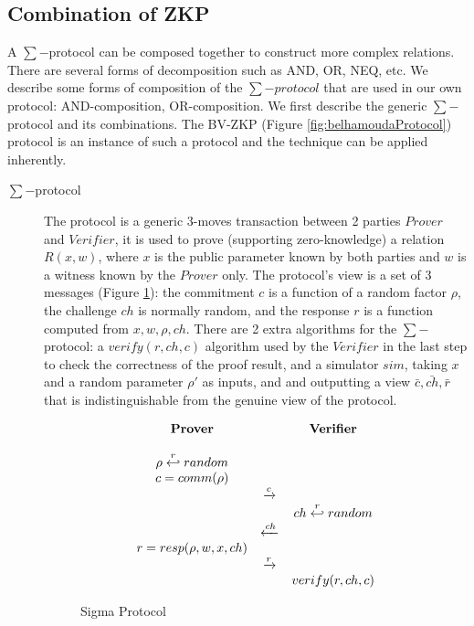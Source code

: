 \subsection{Combination of ZKP}
\label{sec:combination-zkp}
A $\sum-$protocol can be composed together to construct more complex relations.
There are several forms of decomposition such as AND, OR, NEQ, etc.  We describe
some forms of composition of the \(\sum-protocol\) that are used in our own protocol:
AND-composition, OR-composition. We first describe the generic \(\sum-\)protocol
and its combinations. The BV-ZKP (Figure \ref{fig:belhamoudaProtocol}) protocol
is an instance of such a protocol and the technique can be applied inherently.
\begin{description}
\item[$\sum-$protocol] The protocol is a generic 3-moves transaction between 2 parties
  \(Prover\) and \(Verifier\), it is used to prove (supporting zero-knowledge) a
  relation \(R(x,w)\), where \(x\) is the public parameter known by both
  parties and \(w\) is a witness known by the \(Prover\) only. The protocol's
  view is a set of 3 messages (Figure \ref{fig:sigmaProtocol}): the commitment
  \(c\) is a function of a random factor \(\rho\), the challenge \(ch\) is
  normally random, and the response \(r\) is a function computed from
  \(x, w, \rho, ch\). There are 2 extra algorithms for the \(\sum-\)protocol: a
  \(verify(r,ch,c)\) algorithm used by the \(Verifier\) in the last step to
  check the correctness of the proof result, and a simulator \(sim\), taking
  \(x\) and a random parameter \(\rho'\) as inputs, and and outputting a view
  \(\bar{c},\bar{ch},\bar{r}\) that is indistinguishable from the genuine view
  of the protocol.
  \begin{figure}[h!]
    \centering
    \begin{equation*}
      \begin{array}{c c c}
        \text{\textbf{Prover}} & & \text{\textbf{Verifier}} \\
        \\
        \rho \stackrel{r}{\hookleftarrow} random & & \\
        c = comm(\rho) & & \\
                               & \xrightarrow{c} & \\
                               & & ch \stackrel{r}{\hookleftarrow} random \\
                               & \xleftarrow{ch} & \\
        r = resp(\rho,w,x,ch) & & \\
                               & \xrightarrow{r} & \\
                               & & verify(r, ch, c)\\
      \end{array}
    \end{equation*}
    \caption{Sigma Protocol}
    \label{fig:sigmaProtocol}
  \end{figure}
  
\end{description}


